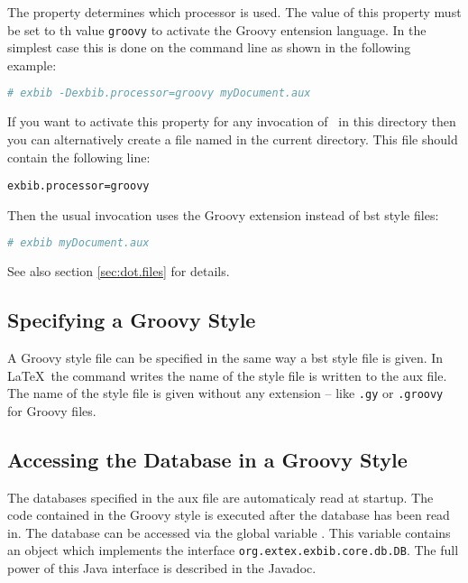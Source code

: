 The property  determines which processor is
used. The value of this property must be set to th value \verb|groovy|
to activate the Groovy entension language. In the simplest case this
is done on the command line as shown in the following example:

\begin{lstlisting}[language=sh]
# exbib -Dexbib.processor=groovy myDocument.aux
\end{lstlisting}

If you want to activate this property for any invocation of \ExBib\ in
this directory then you can alternatively create a file named
 in the current directory. This file should contain the
following line:

\begin{lstlisting}
exbib.processor=groovy
\end{lstlisting}

Then the usual invocation uses the Groovy extension instead of bst
style files:

\begin{lstlisting}[language=sh]
# exbib myDocument.aux
\end{lstlisting}

See also section \ref{sec:dot.files} for details.


\subsection{Specifying a Groovy Style}

A Groovy style file can be specified in the same way a bst style file
is given. In \LaTeX\ the command  writes the
name of the style file is written to the aux file. The name of the
style file is given without any extension -- like \verb|.gy| or
\verb|.groovy| for Groovy files.


\subsection{Accessing the Database in a Groovy Style}

The databases specified in the aux file are automaticaly read at
startup. The code contained in the Groovy style is executed after the
database has been read in. The database can be accessed via the global
variable . This variable contains an object which
implements the interface \texttt{org.extex.exbib.core.db.DB}. The full
power of this Java interface is described in the Javadoc.


